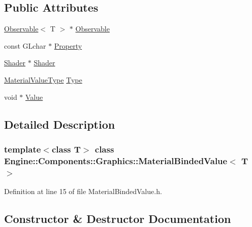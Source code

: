 \subsection*{Public Attributes}
\begin{DoxyCompactItemize}
\item 
\mbox{\hyperlink{classObservable}{Observable}}$<$ T $>$ $\ast$ \mbox{\hyperlink{classEngine_1_1Components_1_1Graphics_1_1MaterialBindedValue_af217c3d5cb01922019f108b064cb2a69}{Observable}}
\item 
const G\+Lchar $\ast$ \mbox{\hyperlink{classEngine_1_1Components_1_1Graphics_1_1MaterialBindedValue_aa538707c0eb31482fdb7e06926404b47}{Property}}
\item 
\mbox{\hyperlink{classEngine_1_1Components_1_1Graphics_1_1Shader}{Shader}} $\ast$ \mbox{\hyperlink{classEngine_1_1Components_1_1Graphics_1_1MaterialBindedValue_a2c069aa41aebee61554ce21b54a08ec8}{Shader}}
\item 
\mbox{\hyperlink{namespaceEngine_1_1Components_1_1Graphics_a44f5a2b57ee82aed849896c8311e403b}{Material\+Value\+Type}} \mbox{\hyperlink{classEngine_1_1Components_1_1Graphics_1_1MaterialBindedValue_acb1b73dd34f8cd4ff9d68f0ce483e372}{Type}}
\item 
void $\ast$ \mbox{\hyperlink{classEngine_1_1Components_1_1Graphics_1_1MaterialBindedValue_a954c91d9f00092782f0ed0b840d92e26}{Value}}
\end{DoxyCompactItemize}


\subsection{Detailed Description}
\subsubsection*{template$<$class T$>$\newline
class Engine\+::\+Components\+::\+Graphics\+::\+Material\+Binded\+Value$<$ T $>$}



Definition at line 15 of file Material\+Binded\+Value.\+h.



\subsection{Constructor \& Destructor Documentation}
\mbox{\label{classEngine_1_1Components_1_1Graphics_1_1MaterialBindedValue_ad2532a61c245e1d557552e2180e08e72}} 
